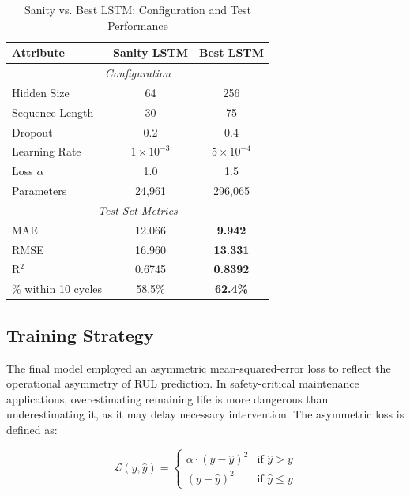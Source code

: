 \documentclass[conference]{IEEEtran}
\begin{document}
\begin{table}[H]
    \centering
    \caption{Sanity vs. Best LSTM: Configuration and Test Performance}
    \label{tab:sanity_vs_best}
    \begin{tabular}{|l|c|c|}
        \hline
        \textbf{Attribute} & \textbf{Sanity LSTM} & \textbf{Best LSTM} \\
        \hline
        \multicolumn{3}{|c|}{\textit{Configuration}} \\
        \hline
        Hidden Size & 64 & 256 \\
        Sequence Length & 30 & 75 \\
        Dropout & 0.2 & 0.4 \\
        Learning Rate & $1\times10^{-3}$ & $5\times10^{-4}$ \\
        Loss $\alpha$ & 1.0 & 1.5 \\
        Parameters & 24,961 & 296,065 \\
        \hline
        \multicolumn{3}{|c|}{\textit{Test Set Metrics}} \\
        \hline
        MAE & 12.066 & \textbf{9.942} \\
        RMSE & 16.960 & \textbf{13.331} \\
        R$^2$ & 0.6745 & \textbf{0.8392} \\
        \% within 10 cycles & 58.5\% & \textbf{62.4\%} \\
        \hline
    \end{tabular}
\end{table}

\subsection{Training Strategy}

The final model employed an asymmetric mean-squared-error loss to reflect the operational asymmetry of RUL prediction. In safety-critical maintenance applications, overestimating remaining life is more dangerous than underestimating it, as it may delay necessary intervention. The asymmetric loss is defined as:

\begin{equation}
\mathcal{L}(y, \hat{y}) =
\begin{cases}
    \alpha \cdot (y - \hat{y})^2 & \text{if } \hat{y} > y \\
    (y - \hat{y})^2 & \text{if } \hat{y} \leq y
\end{cases}
\label{eq:asym_loss}
\end{equation}
\end{document}
